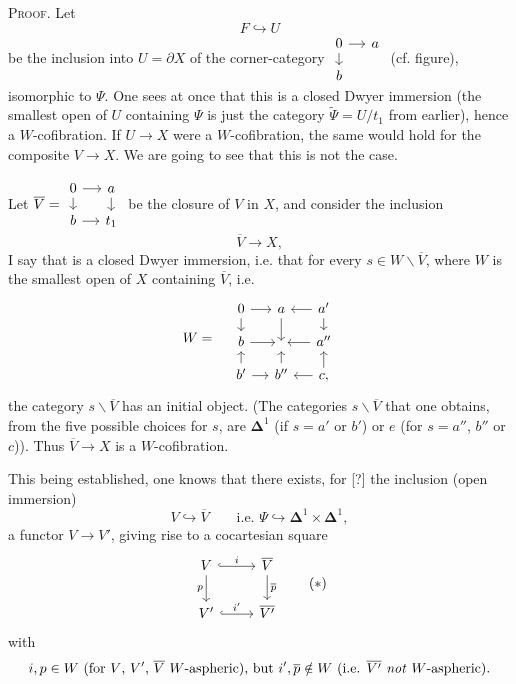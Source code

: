 \documentclass[11pt]{article}
\newcommand{\printedpage}[1]{\marginpar{\footnotesize p.~#1}}
\newcommand{\msp}[1]{\marginpar{\footnotesize [#1]}}
\begin{document}
\printedpage{10}
\textsc{Proof}. Let
\[ F \hookrightarrow U \]
be the inclusion into $U = \partial X$ of the corner-category $\vcenter{\hbox{\begin{tikzcd}[row sep=small, column sep=small]
0 \arrow[r] \arrow[d] & a \\
b &
\end{tikzcd}}}$ (cf. figure), isomorphic to $\Psi$. One sees at once that this is a closed Dwyer immersion (the smallest open of $U$ containing $\Psi$ is just the category $\tilde{\Psi} = U/t_1$ from earlier), hence a $W$-cofibration. If $U \longrightarrow X$ were a $W$-cofibration, the same would hold for the composite $V \longrightarrow X$. We are going to see that this is not the case.

Let $\overline{V} = \vcenter{\hbox{\begin{tikzcd}[row sep=small, column sep=small]
0 \arrow[r] \arrow[d] & a \arrow[d] \\
b \arrow[r] & t_1
\end{tikzcd}}}$ be the closure of $V$ in $X$,
\msp{page 14}and consider the inclusion
\[ \overline{V} \longrightarrow X, \]
I say that is a closed Dwyer immersion, i.e. that for every $s \in W\backslash\overline{V}$, where $W$ is the smallest open of $X$ containing $\overline{V}$, i.e.
\[
W = \quad
\begin{tikzcd}[row sep=small, column sep=small]
0 \arrow[r] \arrow[d] & a \arrow[d] & a' \arrow[l] \arrow[d] \\
b \arrow[r] & {} & a'' \arrow[l] \\
b' \arrow[u] \arrow[r] & b'' \arrow[u] & c, \arrow[l] \arrow[u]
\end{tikzcd}
\]
the category $s\backslash\overline{V}$ has an initial object. (The categories $s\backslash\overline{V}$ that one obtains, from the five possible choices for $s$, are $\boldsymbol{\Delta}^1$ (if $s = a'$ or $b'$) or $e$ (for $s = a''$, $b''$ or $c$)). Thus $\overline{V} \longrightarrow X$ is a $W$-cofibration.

This being established, one knows that there exists, for [?] the inclusion (open immersion)
\[ V \hookrightarrow \overline{V} \qquad \text{i.e. } \Psi \hookrightarrow \boldsymbol{\Delta}^1 \times \boldsymbol{\Delta}^1, \]
a functor $V \longrightarrow V'$, giving rise to a cocartesian square
\[
\begin{tikzcd}
V \arrow[r, hook, "i"] \arrow[d, "p"'] & \overline{V} \arrow[d, "\overline{p}"] \\
V' \arrow[r, hook, "i'"] & \overline{V'}
\end{tikzcd}
\tag*{$(*)$}
\]
with
\[ i, p \in W \ \text{(for $V$, $V'$, $\overline{V}$ $W$-aspheric), but } i', \overline{p} \notin W \ \text{(i.e. $\overline{V'}$ \textit{not} $W$-aspheric).} \]
\end{document}
